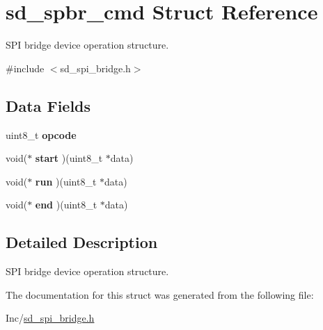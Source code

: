 \hypertarget{structsd__spbr__cmd}{}\section{sd\+\_\+spbr\+\_\+cmd Struct Reference}
\label{structsd__spbr__cmd}


S\+PI bridge device operation structure.  




{\ttfamily \#include $<$sd\+\_\+spi\+\_\+bridge.\+h$>$}

\subsection*{Data Fields}
\begin{DoxyCompactItemize}
\item 
\mbox{\label{structsd__spbr__cmd_a5c1b56e6bccc2a95dbddf1a08e56e87d}} 
uint8\+\_\+t {\bfseries opcode}
\item 
\mbox{\label{structsd__spbr__cmd_ac1d9eb98c8cf34a924c013543ca670bd}} 
void($\ast$ {\bfseries start} )(uint8\+\_\+t $\ast$data)
\item 
\mbox{\label{structsd__spbr__cmd_abdb7e83b3b05f1d432871d558596c6f1}} 
void($\ast$ {\bfseries run} )(uint8\+\_\+t $\ast$data)
\item 
\mbox{\label{structsd__spbr__cmd_a7060c1862b381e8fe2700f35dd3d3f5e}} 
void($\ast$ {\bfseries end} )(uint8\+\_\+t $\ast$data)
\end{DoxyCompactItemize}


\subsection{Detailed Description}
S\+PI bridge device operation structure. 

The documentation for this struct was generated from the following file\+:\begin{DoxyCompactItemize}
\item 
Inc/\mbox{\hyperlink{sd__spi__bridge_8h}{sd\+\_\+spi\+\_\+bridge.\+h}}\end{DoxyCompactItemize}
